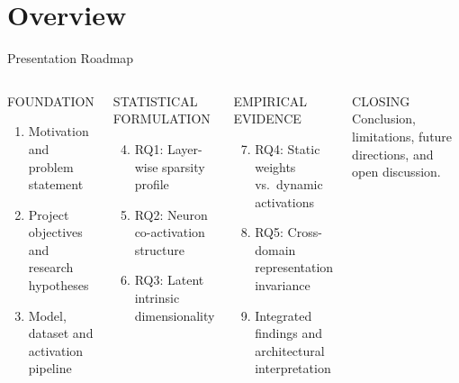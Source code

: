 \documentclass[aspectratio=169,10pt]{beamer}
\begin{document}
\section{Overview}
\begin{frame}{Presentation Roadmap}
\begin{columns}[T,onlytextwidth]
\begin{block}{FOUNDATION}
\begin{enumerate}
  \item Motivation and problem statement
  \item Project objectives and research hypotheses
  \item Model, dataset and activation pipeline
\end{enumerate}
\end{block}
\vspace{3pt}
\begin{block}{STATISTICAL FORMULATION}
\begin{enumerate}\setcounter{enumi}{3}
  \item RQ1: Layer-wise sparsity profile
  \item RQ2: Neuron co-activation structure
  \item RQ3: Latent intrinsic dimensionality
\end{enumerate}
\end{block}
\begin{block}{EMPIRICAL EVIDENCE}
\begin{enumerate}\setcounter{enumi}{6}
  \item RQ4: Static weights vs.\ dynamic activations
  \item RQ5: Cross-domain representation invariance
  \item Integrated findings and architectural interpretation
\end{enumerate}
\end{block}
\vspace{3pt}
\begin{block}{CLOSING}
Conclusion, limitations, future directions, and open discussion.
\end{block}
\end{columns}
\end{frame}
\end{document}
